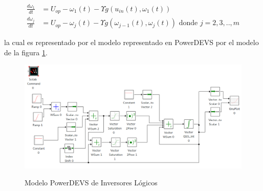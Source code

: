\begin{align*}
\frac{d \omega_1}{d t} & = U_{op} - \omega_1(t) - \Upsilon g (u_{in}(t), \omega_{1} (t))    \\
\frac{d \omega_j}{d t} & = U_{op} - \omega_j(t) - \Upsilon g (\omega_{j-1}(t), \omega_{j} (t)) \textrm{ donde $j = 2, 3, .., m$}
\end{align*}

	la cual es representado por el modelo representado en PowerDEVS por el modelo de la figura \ref{model:inverters}.

\begin{figure}[H]
\includegraphics[width=0.75\linewidth]{inverters}
\label{model:inverters}
\caption{Modelo PowerDEVS de Inversores Lógicos}
\end{figure}

